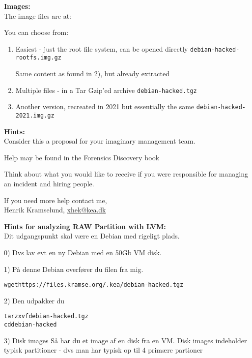 \documentclass[a4paper,11pt,notitlepage,landscape]{report}
\begin{document}
{\bf Images:}\\
The image files are at:

You can choose from:

\begin{enumerate}
\item Easiest - just the root file system, can be opened directly
 \verb+debian-hacked-rootfs.img.gz+

Same content as found in 2), but already extracted

\item Multiple files - in a Tar Gzip'ed archive
\verb+debian-hacked.tgz+

\item Another version, recreated in 2021 but essentially the same
\verb+debian-hacked-2021.img.gz+

\end{enumerate}



{\bf Hints:}\\
Consider this a proposal for your imaginary management team.

Help may be found in the Forensics Discovery book

Think about what you would like to receive if you were responsible for managing an incident and hiring people.

If you need more help contact me,\\


Henrik Kramselund, \url{xhek@kea.dk}

\eject
{\bf Hints for analyzing RAW Partition with LVM:}\\


Dit udgangspunkt skal være en Debian med rigeligt plads.

0) Dvs lav evt en ny Debian med en 50Gb VM disk.


1) På denne Debian overfører du filen fra mig.

\begin{alltt}
wget https://files.kramse.org/.kea/debian-hacked.tgz
\end{alltt}

2) Den udpakker du

\begin{alltt}
tar zxvf debian-hacked.tgz
cd debian-hacked
\end{alltt}

3) Disk images
Så har du et image af en disk fra en VM. Disk images indeholder typisk
partitioner - dvs man har typisk op til 4 primære partioner
\end{document}
